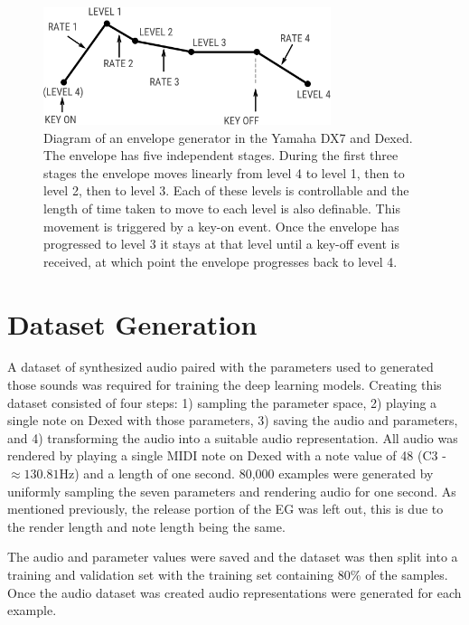 \begin{figure}[ht]
    \centering
    \includegraphics[width=0.75\textwidth]{figures/spiegelib/Yamaha DX7 Envelope.png}
    \caption{Diagram of an envelope generator in the Yamaha DX7 and Dexed. The envelope has five independent stages. During the first three stages the envelope moves linearly from level 4 to level 1, then to level 2, then to level 3. Each of these levels is controllable and the length of time taken to move to each level is also definable. This movement is triggered by a key-on event. Once the envelope has progressed to level 3 it stays at that level until a key-off event is received, at which point the envelope progresses back to level 4.}
    \label{fig:dx7_envelope}
\end{figure}


\section{Dataset Generation}
\label{sec:dataset-generation}

A dataset of synthesized audio paired with the parameters used to generated those sounds was required for training the deep learning models. Creating this dataset consisted of four steps: 1) sampling the parameter space, 2) playing a single note on Dexed with those parameters, 3) saving the audio and parameters, and 4) transforming the audio into a suitable audio representation. All audio was rendered by playing a single MIDI note on Dexed with a note value of 48 (C3 - $\approx 130.81$Hz) and a length of one second. 80,000 examples were generated by uniformly sampling the seven parameters and rendering audio for one second. As mentioned previously, the release portion of the EG was left out, this is due to the render length and note length being the same.

The audio and parameter values were saved and the dataset was then split into a training and validation set with the training set containing 80\% of the samples. Once the audio dataset was created audio representations were generated for each example.

